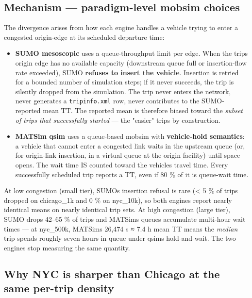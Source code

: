 \subsection{Mechanism --- paradigm-level mobsim
choices}\label{mechanism--paradigm-level-mobsim-choices}

The divergence arises from how each engine handles a vehicle trying to
enter a congested origin-edge at its scheduled departure time:

\begin{itemize}
\tightlist
\item
  \textbf{SUMO mesoscopic} uses a queue-throughput limit per edge. When
  the trip\textquotesingle s origin edge has no available capacity
  (downstream queue full or insertion-flow rate exceeded), SUMO
  \textbf{refuses to insert the vehicle}. Insertion is retried for a
  bounded number of simulation steps; if it never succeeds, the trip is
  silently dropped from the simulation. The trip never enters the
  network, never generates a \texttt{tripinfo.xml} row, never
  contributes to the SUMO-reported mean TT. The reported mean is
  therefore biased toward the \emph{subset of trips that successfully
  started} --- the "easier" trips by construction.
\item
  \textbf{MATSim qsim} uses a queue-based mobsim with
  \textbf{vehicle-hold semantics}: a vehicle that cannot enter a
  congested link waits in the upstream queue (or, for origin-link
  insertion, in a virtual queue at the origin facility) until space
  opens. The wait time IS counted toward the vehicle\textquotesingle s
  travel time. Every successfully scheduled trip reports a TT, even if
  80 \% of it is queue-wait time.
\end{itemize}

At low congestion (small tier), SUMO\textquotesingle s insertion refusal
is rare (\textless{} 5 \% of trips dropped on chicago\_1k and 0 \% on
nyc\_10k), so both engines report nearly identical means on nearly
identical trip sets. At high congestion (large tier), SUMO drops 42--65
\% of trips and MATSim\textquotesingle s queues accumulate multi-hour
wait times --- at nyc\_500k, MATSim\textquotesingle s 26,474 s ≈ 7.4 h
mean TT means the \emph{median} trip spends roughly seven hours in queue
under qsim\textquotesingle s hold-and-wait. The two engines stop
measuring the same quantity.

\subsection{Why NYC is sharper than Chicago at the same per-trip
density}\label{why-nyc-is-sharper-than-chicago-at-the-same-per-trip-density}

